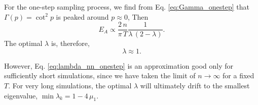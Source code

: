 \documentclass[reprint, floatfix]{revtex4-1}
\newcommand{\Err}{E}
\begin{document}
For the one-step sampling process,
we find from Eq. \eqref{eq:Gamma_onestep}
that $\Gamma(p) = \cot^2 p$
is peaked around $p \approx 0$,
%
Then
$$
  \Err_A
  \propto
  \frac{   2 \, n }
       { \pi \, T }
  \frac{             1             }
       {  \lambda \, (2 - \lambda) }
  .
$$
%
The optimal $\lambda$ is, therefore,
%
\begin{equation}
\lambda \approx 1.
\label{eq:lambda_nn_onestep}
\end{equation}
%


However, Eq. \eqref{eq:lambda_nn_onestep}
is an approximation good only
for sufficiently short simulations,
since we have taken the limit of $n \to \infty$
for a fixed $T$.
%
For very long simulations,
the optimal $\lambda$
will ultimately drift to
the smallest eigenvalue,
$\min \lambda_k = 1 - 4 \, \mu_1$.







\end{document}
